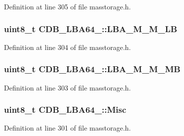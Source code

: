 \-Definition at line 305 of file masstorage.\-h.

\hypertarget{struct_c_d_b___l_b_a64__16_aed9c8595adf84a0fde2176afe2e45608}{
\subsubsection[{\-L\-B\-A\-\_\-\-M\-\_\-\-M\-\_\-\-L\-B}]{\setlength{\rightskip}{0pt plus 5cm}uint8\-\_\-t {\bf \-C\-D\-B\-\_\-\-L\-B\-A64\-\_\-::\-L\-B\-A\-\_\-\-M\-\_\-\-M\-\_\-\-L\-B}}}\label{struct_c_d_b___l_b_a64__16_aed9c8595adf84a0fde2176afe2e45608}


\-Definition at line 304 of file masstorage.\-h.

\hypertarget{struct_c_d_b___l_b_a64__16_a0d132ae68523608e5365f253072da224}{
\subsubsection[{\-L\-B\-A\-\_\-\-M\-\_\-\-M\-\_\-\-M\-B}]{\setlength{\rightskip}{0pt plus 5cm}uint8\-\_\-t {\bf \-C\-D\-B\-\_\-\-L\-B\-A64\-\_\-::\-L\-B\-A\-\_\-\-M\-\_\-\-M\-\_\-\-M\-B}}}\label{struct_c_d_b___l_b_a64__16_a0d132ae68523608e5365f253072da224}


\-Definition at line 303 of file masstorage.\-h.

\hypertarget{struct_c_d_b___l_b_a64__16_a5f3b9efa508e9e3d79a70414ea5c74ff}{
\subsubsection[{\-Misc}]{\setlength{\rightskip}{0pt plus 5cm}uint8\-\_\-t {\bf \-C\-D\-B\-\_\-\-L\-B\-A64\-\_\-::\-Misc}}}\label{struct_c_d_b___l_b_a64__16_a5f3b9efa508e9e3d79a70414ea5c74ff}


\-Definition at line 301 of file masstorage.\-h.

